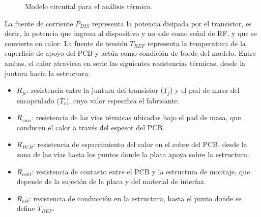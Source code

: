 \begin{figure}
    \centering
    \caption{Modelo circuital para el análisis térmico.}
    \label{fig:thermal_analysis}
\end{figure}

La fuente de corriente $P_{DIS}$ representa la potencia disipada por el transistor, es decir, la potencia que ingresa al dispositivo y no sale como señal de RF, y que se convierte en calor. La fuente de tensión $T_{REF}$ representa la temperatura de la superficie de apoyo del PCB y actúa como condición de borde del modelo. Entre ambas, el calor atraviesa en serie las siguientes resistencias térmicas, desde la juntura hacia la estructura.

\begin{itemize}
    \item $R_{jc}$: resistencia entre la juntura del transistor ($T_j$) y el pad de masa del encapsulado ($T_c$), cuyo valor especifica el fabricante.
    \item $R_{vias}$: resistencia de las vías térmicas ubicadas bajo el pad de masa, que conducen el calor a través del espesor del PCB.
    \item $R_{PCB}$: resistencia de esparcimiento del calor en el cobre del PCB, desde la zona de las vías hasta los puntos donde la placa apoya sobre la estructura.
    \item $R_{cont}$: resistencia de contacto entre el PCB y la estructura de montaje, que depende de la sujeción de la placa y del material de interfaz.
    \item $R_{est}$: resistencia de conducción en la estructura, hasta el punto donde se define $T_{REF}$.
\end{itemize}

